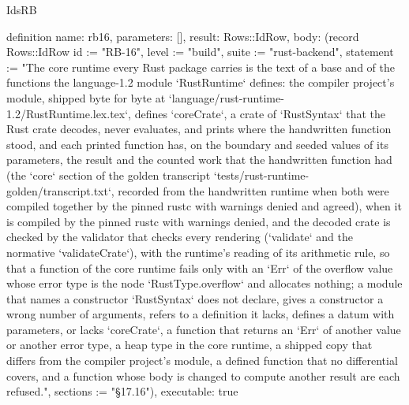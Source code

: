\begin{lexlean}{IdsRB}
\begin{semanticmodule}
definition{
  name: rb16,
  parameters: [],
  result: Rows::IdRow,
  body: (record Rows::IdRow {id := "RB-16", level := "build", suite := "rust-backend", statement := "The core runtime every Rust package carries is the text of a base and of the functions the language-1.2 module `RustRuntime` defines: the compiler project's module, shipped byte for byte at `language/rust-runtime-1.2/RustRuntime.lex.tex`, defines `coreCrate`, a crate of `RustSyntax` that the Rust crate decodes, never evaluates, and prints where the handwritten function stood, and each printed function has, on the boundary and seeded values of its parameters, the result and the counted work that the handwritten function had (the `core` section of the golden transcript `tests/rust-runtime-golden/transcript.txt`, recorded from the handwritten runtime when both were compiled together by the pinned rustc with warnings denied and agreed), when it is compiled by the pinned rustc with warnings denied, and the decoded crate is checked by the validator that checks every rendering (`validate` and the normative `validateCrate`), with the runtime's reading of its arithmetic rule, so that a function of the core runtime fails only with an `Err` of the overflow value whose error type is the node `RustType.overflow` and allocates nothing; a module that names a constructor `RustSyntax` does not declare, gives a constructor a wrong number of arguments, refers to a definition it lacks, defines a datum with parameters, or lacks `coreCrate`, a function that returns an `Err` of another value or another error type, a heap type in the core runtime, a shipped copy that differs from the compiler project's module, a defined function that no differential covers, and a function whose body is changed to compute another result are each refused.", sections := "§17.16"}),
  executable: true
}


\end{semanticmodule}
\end{lexlean}
